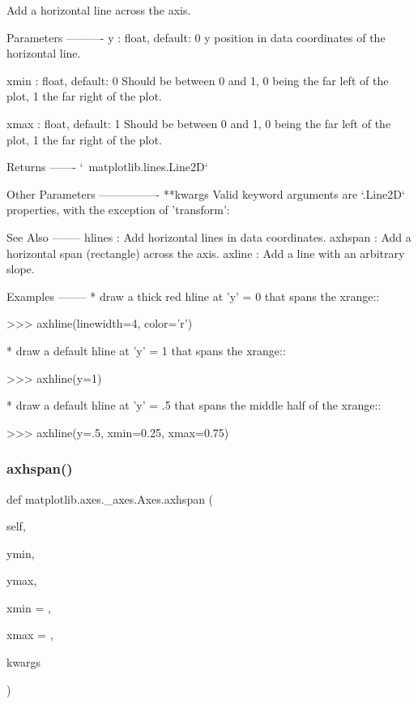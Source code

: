\begin{DoxyVerb}Add a horizontal line across the axis.

Parameters
----------
y : float, default: 0
    y position in data coordinates of the horizontal line.

xmin : float, default: 0
    Should be between 0 and 1, 0 being the far left of the plot, 1 the
    far right of the plot.

xmax : float, default: 1
    Should be between 0 and 1, 0 being the far left of the plot, 1 the
    far right of the plot.

Returns
-------
`~matplotlib.lines.Line2D`

Other Parameters
----------------
**kwargs
    Valid keyword arguments are `.Line2D` properties, with the
    exception of 'transform':


See Also
--------
hlines : Add horizontal lines in data coordinates.
axhspan : Add a horizontal span (rectangle) across the axis.
axline : Add a line with an arbitrary slope.

Examples
--------
* draw a thick red hline at 'y' = 0 that spans the xrange::

    >>> axhline(linewidth=4, color='r')

* draw a default hline at 'y' = 1 that spans the xrange::

    >>> axhline(y=1)

* draw a default hline at 'y' = .5 that spans the middle half of
  the xrange::

    >>> axhline(y=.5, xmin=0.25, xmax=0.75)
\end{DoxyVerb}
 \mbox{\label{classmatplotlib_1_1axes_1_1__axes_1_1Axes_a16015052a14c403c1a060e89fb36a62d}} 
\subsubsection{\texorpdfstring{axhspan()}{axhspan()}}
{\footnotesize\ttfamily def matplotlib.\+axes.\+\_\+axes.\+Axes.\+axhspan (\begin{DoxyParamCaption}\item[{}]{self,  }\item[{}]{ymin,  }\item[{}]{ymax,  }\item[{}]{xmin = {},  }\item[{}]{xmax = {},  }\item[{}]{kwargs }\end{DoxyParamCaption})}

